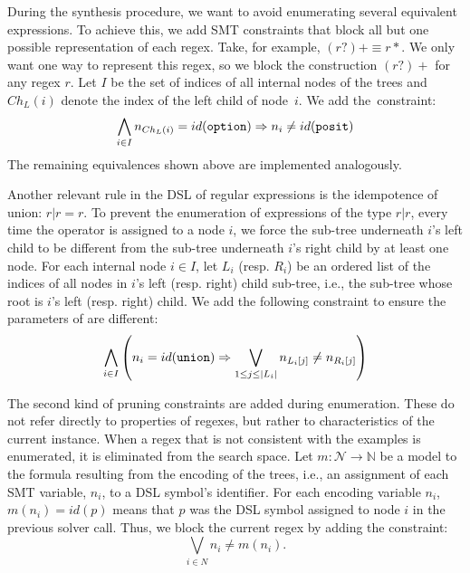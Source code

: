\noindent
During the synthesis procedure, we want to avoid enumerating several equivalent expressions. To achieve this, we add \ac{SMT} constraints that block all but one possible representation of each regex. Take, for example, \({(r?)+ \equiv r*}\). We only want one way to represent this regex, so we block the construction \((r?)+\) for any regex \(r\).
Let \(I\) be the set of indices of all internal nodes of the trees and \(Ch_L(i)\) denote the index of the left child of node~\(i\). We add the~constraint:
\begin{equation}
     \bigwedge_{i \in I} n_{Ch_L(i)} = id(\texttt{option}{}) \Rightarrow n_i \ne id(\texttt{posit}{})
\end{equation}
The remaining equivalences shown above are implemented analogously.

Another relevant rule in the DSL of regular expressions is the idempotence of union: \(r|r = r\).
To prevent the enumeration of expressions of the type \(r|r\), every time the \Union{} operator is assigned to a node \(i\), %
we force the sub-tree underneath \(i\)'s left child to be different from the sub-tree underneath \(i\)'s right child by at least one node.
For each internal node \(i \in I\), let \(L_i\) (resp. \(R_i\)) be an ordered list of the indices of all nodes in \(i\)'s left (resp. right) child sub-tree, i.e., the sub-tree whose root is \(i\)'s left (resp. right) child. %
We add the following constraint to ensure the parameters of \Union{} are different:
\begin{equation}
  \bigwedge_{i \in I} \left( n_i = id(\texttt{union}{}) \Rightarrow \bigvee_{1 \le j \le |L_i|} n_{L_i[j]} \ne n_{R_i[j]} \right)
\end{equation}

The second kind of pruning constraints are added during enumeration. These do not refer directly to properties of regexes, but rather to characteristics of the current instance. When a regex that is not consistent with the examples is enumerated, it is eliminated from the search space. 
Let \(m: \mathcal{N} \to \mathbb{N}\) be a model to the formula resulting from the encoding of the trees, i.e., an assignment of each \ac{SMT} variable, \(n_i\), to a DSL symbol's identifier. For each encoding variable \(n_i\), \(m(n_i) = id(p)\) means that $p$ was the DSL symbol assigned to node $i$ in the previous solver call.
%
Thus, %
we block the current regex by adding the constraint:
\begin{equation}
  \bigvee_{i \in N} n_i \ne m(n_i).
\end{equation}

